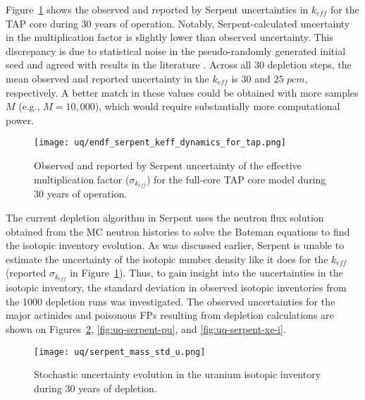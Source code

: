 Figure~\ref{fig:uq-serpent-keff-evolution} shows the observed and reported by 
Serpent uncertainties in $k_{eff}$ for the \gls{TAP} core during 30 years of 
operation. Notably, Serpent-calculated uncertainty in the multiplication 
factor is slightly lower than observed uncertainty. This discrepancy is due to 
statistical noise in the pseudo-randomly generated initial seed and agreed 
with results in the literature 
\cite{wyant_numerical_2012}. Across all 30 depletion steps, the mean observed 
and reported uncertainty in the $k_{eff}$ is $30$ and $25$ $pcm$, 
respectively. A better match in these values could be obtained with more 
samples $M$ (e.g., $M=10,\!000$), which would require substantially more 
computational power.
\begin{figure}[hbp!] %
	\centering
	\texttt{[image: uq/endf\_serpent\_keff\_dynamics\_for\_tap.png]}
	\caption{Observed and reported by Serpent uncertainty of the effective 
		multiplication factor ($\sigma_{k_{eff}}$) for the full-core \gls{TAP} 
		core model during 30 years of operation.}
	\label{fig:uq-serpent-keff-evolution}
\end{figure}

The current depletion algorithm in Serpent uses the neutron flux solution 
obtained from the \gls{MC} neutron histories to solve the Bateman equations to 
find the isotopic inventory evolution. As was discussed earlier, Serpent 
is unable to estimate the uncertainty of the isotopic number density like it 
does for the $k_{eff}$ (reported $\sigma_{k_{eff}}$ in 
Figure~\ref{fig:uq-serpent-keff-evolution}). Thus, to gain insight into the 
uncertainties in the isotopic inventory, the standard deviation in observed 
isotopic inventories from the 1000 depletion runs was investigated. The 
observed uncertainties for the major actinides and poisonous \glspl{FP} 
resulting from depletion calculations are shown on  
Figures~\ref{fig:uq-serpent-u}, \ref{fig:uq-serpent-pu}, and 
\ref{fig:uq-serpent-xe-i}.

\begin{figure}[htp!] %
	\centering
	\texttt{[image: uq/serpent\_mass\_std\_u.png]}
	\vspace{-4mm}
	\caption{Stochastic uncertainty evolution in the uranium isotopic 
		inventory during 30 years of depletion.}
	\label{fig:uq-serpent-u}
\end{figure}

